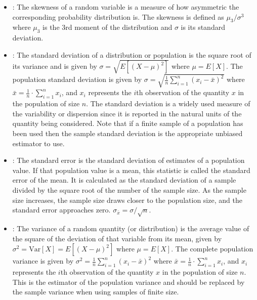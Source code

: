 \documentclass[draftspec]{sbmlpkgspec}
\begin{document}
\begin{itemize}
\item {}:  The skewness of a random variable is a measure of how asymmetric the corresponding probability distribution is. The skewness is defined as $ \mu_3/\sigma^3 $ where $ \mu_3 $ is the 3rd  moment of the distribution and $ \sigma $ is its standard deviation.

\item {}:  The standard deviation of a distribution or population is the square root of its variance and is given by $ \sigma = \sqrt{E[(X - \mu)^2]} $ where $ \mu = E[X] $. The population standard deviation is given by $ \sigma = \sqrt{\frac{1}{n} \sum_{i=1}^n\left(x_i - \bar{x} \right)^2} $ where $ \bar{x} = \frac{1}{n}\cdot \sum_{i=1}^n{x_i} $, and $ x_i $ represents the $ i $th observation of the quantity $ x $ in the population of size $ n $. The standard deviation is a widely used measure of the variability or dispersion since it is reported in the natural units of the quantity being considered. Note that if a finite sample of a population has been used then the sample standard deviation is the appropriate unbiased estimator to use.

\item {}:  The standard error is the standard deviation of estimates of a population value. If that population value is a mean, this statistic is called the standard error of the mean.  It is calculated as the standard deviation of a sample divided by the square root of the number of the sample size.  As the sample size increases, the sample size draws closer to the population size, and the standard error approaches zero.  $ \sigma_{\bar{x}} = \sigma/\sqrt{n} $.

\item {}:  The variance of a random quantity (or distribution) is the average value of the square of the deviation of that variable from its mean, given by $ \sigma^2 = \text{Var}[X] = E[(X - \mu)^2] $ where $ \mu = E[X] $. The complete population variance is given by $ \sigma^2 = \frac{1}{n} \sum_{i=1}^n\left(x_i - \bar{x} \right)^2 $ where $ \bar{x} = \frac{1}{n}\cdot \sum_{i=1}^n{x_i} $, and $ x_i $ represents the $ i $th observation of the quantity $ x $ in the population of size $ n $. This is the estimator of the population variance and should be replaced by the sample variance when using samples of finite size.

\end{itemize}
\end{document}
